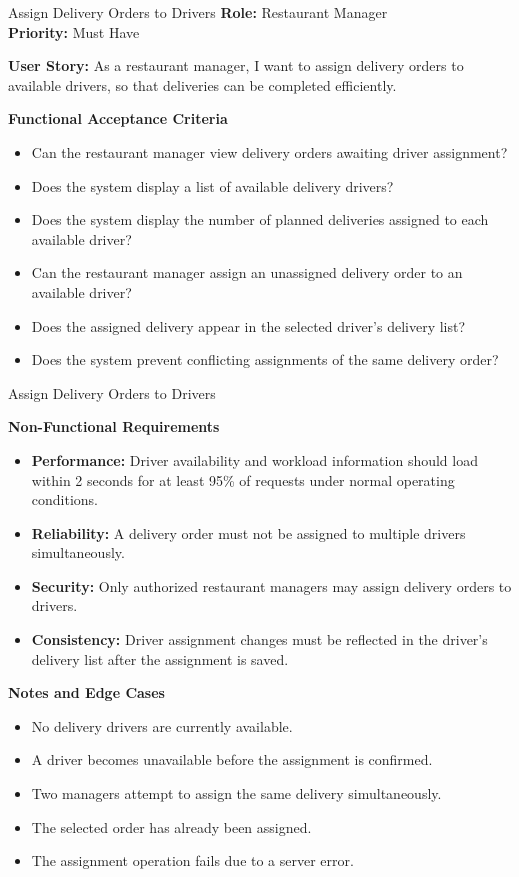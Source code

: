 
\begin{frame}{Assign Delivery Orders to Drivers}
\noindent\textbf{Role:} Restaurant Manager\\
\textbf{Priority:} Must Have

\textbf{User Story:} As a restaurant manager, I want to assign delivery orders to available drivers, so that deliveries can be completed efficiently.

\textbf{Functional Acceptance Criteria}
\begin{itemize}
  \item Can the restaurant manager view delivery orders awaiting driver assignment?
  \item Does the system display a list of available delivery drivers?
  \item Does the system display the number of planned deliveries assigned to each available driver?
  \item Can the restaurant manager assign an unassigned delivery order to an available driver?
  \item Does the assigned delivery appear in the selected driver's delivery list?
  \item Does the system prevent conflicting assignments of the same delivery order?
\end{itemize}

\end{frame}

\begin{frame}{Assign Delivery Orders to Drivers}

\textbf{Non-Functional Requirements}
\begin{itemize}
  \item \textbf{Performance:} Driver availability and workload information should load within 2 seconds for at least 95\% of requests under normal operating conditions.
  \item \textbf{Reliability:} A delivery order must not be assigned to multiple drivers simultaneously.
  \item \textbf{Security:} Only authorized restaurant managers may assign delivery orders to drivers.
  \item \textbf{Consistency:} Driver assignment changes must be reflected in the driver's delivery list after the assignment is saved.
\end{itemize}

\textbf{Notes and Edge Cases}
\begin{itemize}
  \item No delivery drivers are currently available.
  \item A driver becomes unavailable before the assignment is confirmed.
  \item Two managers attempt to assign the same delivery simultaneously.
  \item The selected order has already been assigned.
  \item The assignment operation fails due to a server error.
\end{itemize}

\end{frame}
